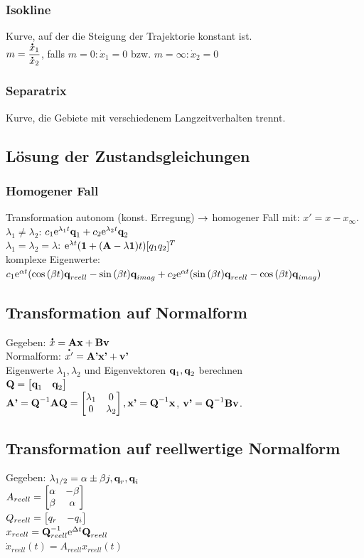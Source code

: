 \documentclass[fs, footer]{latex4ei}
\begin{document}
\begin{multicols*}{4}
		\subsubsection{Isokline}
		Kurve, auf der die Steigung der Trajektorie konstant ist.\\
		$m = \dfrac {\accentset{\mbox{\textrm{\large\bfseries .}} }{x}_1}{\accentset{\mbox{\textrm{\large\bfseries .}} }{x}_2}$, falls $m = 0: \dot x_1 = 0$ bzw. $m = \infty: \dot x_2 = 0$
		\subsubsection{Separatrix}
		Kurve, die Gebiete mit verschiedenem Langzeitverhalten trennt.
	\subsection{Lösung der Zustandsgleichungen}
		\subsubsection{Homogener Fall}
		Transformation autonom (konst. Erregung) $\rightarrow$ homogener Fall mit: $x' = x - x_\infty$.\\
		$\lambda_1 \neq \lambda_2$: $c_1\mathrm{e}^{\lambda_1t}\textbf{q}_1 + c_2\mathrm{e}^{\lambda_2t}\textbf{q}_2$\\
		$\lambda_1 = \lambda_2 = \lambda$: $\mathrm{e}^{\lambda t}(\textbf{1} + (\textbf{A} -\lambda \textbf{1})t) [q_1 q_2]^T$\\
		komplexe Eigenwerte: $c_1 \mathrm{e}^{\alpha t}(\cos{(\beta t)}\textbf{q}_{reell} - \sin{(\beta t)}\textbf{q}_{imag} + c_2\mathrm{e}^{\alpha t}(\sin{(\beta t)}\textbf{q}_{reell} - \cos{(\beta t)}\textbf{q}_{imag})$\\
		\subsection{Transformation auf Normalform}
		Gegeben: $\accentset{\mbox{\textrm{\large\bfseries .}} }{x} = \textbf{A}\textbf{x} + \textbf{B}\textbf{v}$\\
		Normalform: $\accentset{\mbox{\textrm{\large\bfseries .}} }{x'} = \textbf{A'}\textbf{x'} + \textbf{v'}$\\
		Eigenwerte $\lambda_1, \lambda_2$ und Eigenvektoren $\textbf{q}_1, \textbf{q}_2$ berechnen\\
		$\textbf{Q} =  \begin{bmatrix} \textbf{q}_1 & \textbf{q}_2  \end{bmatrix}$\\
		$\textbf{A'} = \textbf{Q}^{-1}\textbf{A}\textbf{Q} = \begin{bmatrix} \lambda_1 & 0 \\ 0 & \lambda_2  \end{bmatrix}, \textbf{x'} = \textbf{Q}^{-1}\textbf{x}$, $\textbf{v'} = \textbf{Q}^{-1}\textbf{B}\textbf{v}$.  
		\subsection{Transformation auf reellwertige Normalform}
		Gegeben: $\lambda_{1/2} = \alpha \pm \beta j, \textbf{q}_r, \textbf{q}_i$\\
		$A_{reell} =  \begin{bmatrix} \alpha & - \beta \\ \beta & \alpha \end{bmatrix}$\\
		$Q_{reell} = \begin{bmatrix}  q_r & - q_i \end{bmatrix}$\\
		$x_{reell} = \textbf{Q}_{reell}^{-1} \mathrm{e}^{\Delta t}\textbf{Q}_{reell}$\\
		$\dot{x}_{reell} (t) = A_{reell}x_{reell}(t)$\\ 

\end{multicols*}
\end{document}
